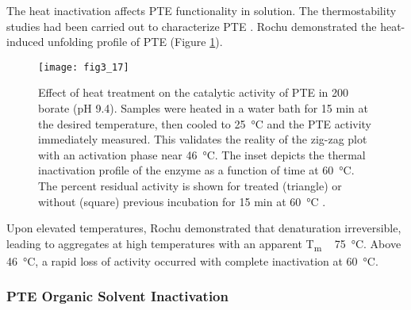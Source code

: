 \begin{refsection}
The heat inactivation affects PTE functionality in solution. The thermostability
studies had been carried out to characterize PTE
\cite{Rochu2002b,Grimsley1997b}. Rochu  demonstrated the
heat-induced unfolding profile of PTE \cite{Rochu2002b} (Figure
\ref{fig:pte-thermo-inactive}). 
\begin{figure}[htbp] \centering \texttt{[image: fig3\_17]}
    \caption[Effect of heat treatment on the catalytic activity of PTE in
    \SI{200}{\milli\Molar} borate (pH 9.4). Samples were heated in a water bath
for 15 min at the desired temperature, then cooled to \SI{25}{\celsius} and the
PTE activity immediately measured. This validates the reality of the zig-zag
plot with an activation phase near \SI{46}{\celsius}. The inset depicts the
thermal inactivation profile of the enzyme as a function of time at
\SI{60}{\celsius}. The percent residual activity is shown for treated
(triangle) or without (square) previous incubation for 15 min at
\SI{60}{\celsius}.]{Effect of heat treatment on the catalytic activity of PTE
    in \SI{200}{\milli\Molar} borate (pH 9.4). Samples were heated in a water
    bath for 15 min at the desired temperature, then cooled to
    \SI{25}{\celsius} and the PTE activity immediately measured. This validates
    the reality of the zig-zag plot with an activation phase near
    \SI{46}{\celsius}. The inset depicts the thermal inactivation profile of
    the enzyme as a function of time at \SI{60}{\celsius}. The percent
    residual activity is shown for treated (triangle) or without (square)
    previous incubation for 15 min at \SI{60}{\celsius} \cite{Rochu2002b}.}
    \label{fig:pte-thermo-inactive} 
\end{figure}

Upon elevated temperatures, Rochu  demonstrated that denaturation
irreversible, leading to aggregates at high temperatures with an apparent
T\textsubscript{m} ~ \SI{75}{\celsius}. Above \SI{46}{\celsius}, a rapid loss
of activity occurred with complete inactivation at \SI{60}{\celsius}. 

\subsubsection{PTE Organic Solvent Inactivation}


\end{refsection}
